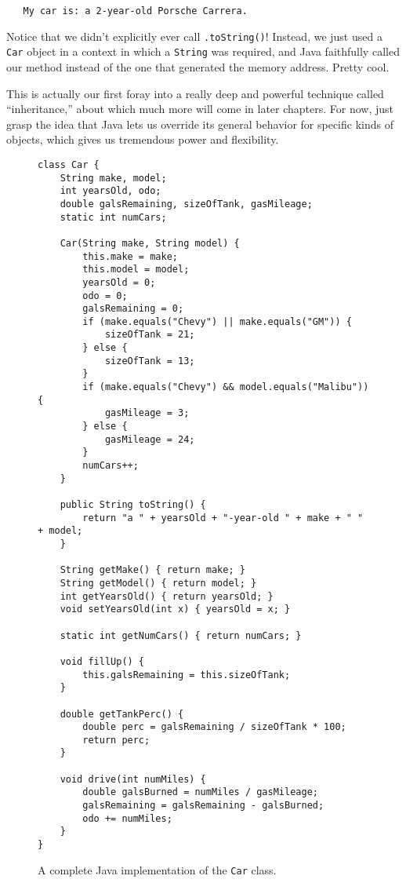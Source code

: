 \begin{verbatim}
   My car is: a 2-year-old Porsche Carrera.
\end{verbatim}

Notice that we didn't explicitly ever call \texttt{.toString()}! Instead, we
just used a \texttt{Car} object in a context in which a \texttt{String} was
required, and Java faithfully called our method instead of the one that
generated the memory address. Pretty cool.

This is actually our first foray into a really deep and powerful technique
called ``inheritance,'' about which much more will come in later chapters. For
now, just grasp the idea that Java lets us override its general behavior for
specific kinds of objects, which gives us tremendous power and flexibility.


\begin{figure}
\begin{Verbatim}[fontsize=\scriptsize,frame=single]
class Car {
    String make, model;
    int yearsOld, odo;
    double galsRemaining, sizeOfTank, gasMileage;
    static int numCars;

    Car(String make, String model) {
        this.make = make;
        this.model = model;
        yearsOld = 0;
        odo = 0;
        galsRemaining = 0;
        if (make.equals("Chevy") || make.equals("GM")) {
            sizeOfTank = 21;
        } else {
            sizeOfTank = 13;
        }
        if (make.equals("Chevy") && model.equals("Malibu")) {
            gasMileage = 3;
        } else {
            gasMileage = 24;
        }
        numCars++;
    }

    public String toString() {
        return "a " + yearsOld + "-year-old " + make + " " + model;
    }

    String getMake() { return make; }
    String getModel() { return model; }
    int getYearsOld() { return yearsOld; }
    void setYearsOld(int x) { yearsOld = x; }

    static int getNumCars() { return numCars; }

    void fillUp() {
        this.galsRemaining = this.sizeOfTank;
    }

    double getTankPerc() {
        double perc = galsRemaining / sizeOfTank * 100;
        return perc;
    }

    void drive(int numMiles) {
        double galsBurned = numMiles / gasMileage;
        galsRemaining = galsRemaining - galsBurned;
        odo += numMiles;
    }
}
\end{Verbatim}
\caption{A complete Java implementation of the \texttt{Car} class.}
\label{fig:carClassCodePreExceptions}
\end{figure}

